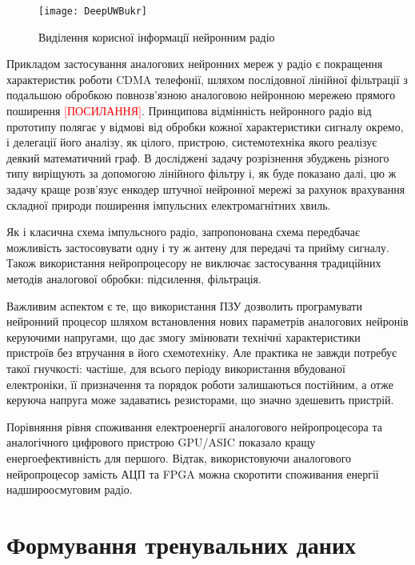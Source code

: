\begin{figure}[htbp] \begin{center}
\texttt{[image: DeepUWBukr]}
\caption{Виділення корисної інформації нейронним радіо} 
\label{fig:DeepUWB}
\end{center} \end{figure}

Прикладом застосування аналогових нейронних мереж у радіо є покращення 
характеристик роботи CDMA телефонії, шляхом послідовної лінійної фільтрації
з подальшою обробкою повнозв'язною аналоговою нейронною мережею прямого 
поширення \textcolor{red}{[ПОСИЛАННЯ]}. Принципова відмінність нейронного
радіо від прототипу полягає у відмові від обробки кожної характеристики 
сигналу окремо, і делегації його аналізу, як цілого, пристрою, системотехніка 
якого реалізує деякий математичний граф. В досліджені \cite{imp:Zhang2009} 
задачу розрізнення збуджень різного типу виріщують за допомогою лінійного 
фільтру і, як буде показано далі, цю ж задачу краще розв'язує енкодер штучної 
нейронної мережі за рахунок врахування складної природи поширення імпульсних 
електромагнітних хвиль.

Як і класична схема імпульсного радіо, запропонована схема передбачає 
можливість застосовувати одну і ту ж антену для передачі та прийму сигналу. 
Також використання нейропроцесору не виключає застосування традиційних 
методів аналогової обробки: підсилення, фільтрація.

Важливим аспектом є те, що використання ПЗУ дозволить програмувати нейронний 
процесор шляхом встановлення нових параметрів аналогових нейронів керуючими 
напругами, що дає змогу змінювати технічні характеристики пристроїв без 
втручання в його схемотехніку. Але практика не завжди потребує такої 
гнучкості: частіше, для всього періоду використання вбудованої електроніки, 
її призначення та порядок роботи залишаються постійним, а отже керуюча 
напруга може задаватись резисторами, що значно здешевить пристрій.

Порівняння рівня споживання електроенергії аналогового нейропроцесора та 
аналогічного цифрового пристрою GPU/ASIC \cite{imp:AnalogLSTM} показало 
кращу енергоефективність для першого. Відтак, використовуючи аналогового 
нейропроцесор замість АЦП та FPGA можна скоротити споживання енергії 
надшироосмуговим радіо.

\section{Формування тренувальних даних}

